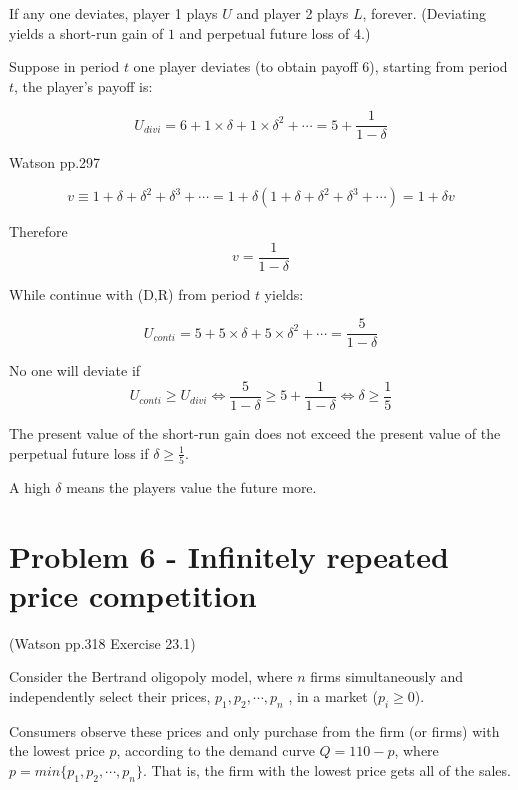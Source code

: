 \documentclass{article}
\begin{document}
\medskip

If any one deviates, player 1 plays $U$ and player 2 plays $L$, forever.
(Deviating yields a short-run gain of $1$ and perpetual future loss of $4$.) 

\medskip

Suppose in period $t$ one player deviates (to obtain payoff 6), starting from period $t$, the player's payoff is:

$$U_{divi} = 6 + 1\times \delta + 1\times \delta^2 + \cdots = 5 + \frac{1}{1-\delta}$$

\begin{mdframed}[backgroundcolor=blue!20,linecolor=white]
Watson pp.297

$$v \equiv 1 + \delta + \delta^2 + \delta^3 + \cdots = 1 + \delta ( 1 + \delta +\delta^2 + \delta^3 + \cdots) = 1 + \delta v$$

Therefore $$v= \frac{1}{1-\delta}$$
\end{mdframed}

While continue with (D,R) from period $t$ yields:

$$U_{conti} = 5 + 5\times \delta + 5\times \delta^2 + \cdots = \frac{5}{1-\delta}$$

No one will deviate if $$U_{conti} \ge U_{divi} \iff \frac{5}{1-\delta} \ge 5 + \frac{1}{1-\delta} \iff  \delta \ge \frac{1}{5} $$

The present value of the short-run gain does not exceed the present value of the perpetual future loss if $\delta \geq \tfrac15$.

\begin{mdframed}[backgroundcolor=blue!20,linecolor=white]
A high $\delta$ means the players value the future more.
\end{mdframed}

\newpage

\section{Problem 6 - Infinitely repeated price competition}

(Watson pp.318 Exercise 23.1)


Consider the Bertrand oligopoly model, where $n$ firms simultaneously and independently
select their prices, $p_1 , p_2 , \cdots , p_n$ , in a market ($p_i \ge 0$). 

\smallskip

Consumers observe these prices and only purchase
from the firm (or firms) with the lowest price $p$, according to the demand
curve $Q = 110 - p$, where $p = min\{p_1 , p_2 , \cdots , p_n\}$. That is, the firm with the lowest price gets all of the sales. 
\end{document}
